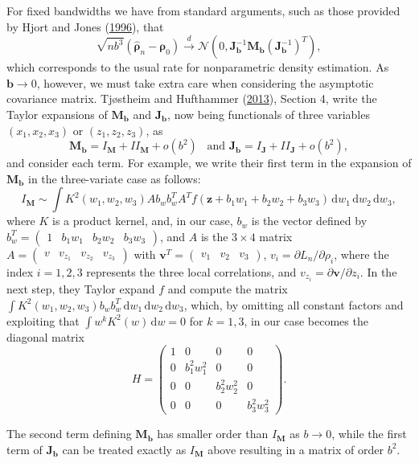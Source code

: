 \documentclass[
  12pt,
  letterpaper]{article}
\numberwithin{equation}{section}
\newcommand{\z}{\bm{z}}
\newcommand{\fv}{\bm{v}}
\newcommand{\frho}{\bm{\rho}}
\newcommand{\hfrho}{\widehat{\bm{\rho}}}
\newcommand{\hh}{\bm{b}}
\newcommand{\Jb}{\bm{J}_{\hh}}
\newcommand{\Mb}{\bm{M}_{\hh}}
\begin{document}
For fixed bandwidths we have from standard arguments, such as those provided by Hjort and Jones (\protect\hyperlink{ref-hjort1996locally}{1996}), that
\begin{equation}
\sqrt{nb^3}\left(\hfrho_n - \frho_0\right) \stackrel{d}{\rightarrow} \mathcal{N}(0, \Jb^{-1}\Mb(\Jb^{-1})^T),
\label{eq:fixed-h}
\end{equation}
which corresponds to the usual rate for nonparametric density estimation. As \(\hh\rightarrow0\), however, we must take extra care when considering the asymptotic covariance matrix. Tjøstheim and Hufthammer (\protect\hyperlink{ref-tjostheim2013local}{2013}), Section 4, write the Taylor expansions of \(\Mb\) and \(\Jb\), now being functionals of three variables \((x_1, x_2, x_3)\) or \((z_1,z_2,z_3)\), as
\[\Mb = I_{\bm{M}} + II_{\bm{M}} + o(b^2) \,\,\, \textrm{ and } \Jb = I_{\bm{J}} + II_{\bm{J}} + o(b^2),\]
and consider each term. For example, we write their first term in the expansion of \(\Mb\) in the three-variate case as follows:
\[I_{\bm{M}} \sim \int K^2(w_1, w_2, w_3)Ab_wb_w^TA^Tf(\z + b_1w_1 + b_2w_2 + b_3w_3)\,\textrm{d}w_1\,\textrm{d}w_2\,\textrm{d}w_3,\]
where \(K\) is a product kernel, and, in our case, \(b_w\) is the vector defined by \(b_w^T = \begin{pmatrix} 1 & b_1w_1 & b_2w_2 & b_3w_3 \end{pmatrix}\), and \(A\) is the \(3\times 4\) matrix \(A = \begin{pmatrix} v & v_{z_1} & v_{z_2} & v_{z_3}\end{pmatrix}\) with \(\fv^T = \begin{pmatrix} v_1 & v_2 & v_3 \end{pmatrix}\), \(v_i = \partial L_n/\partial \rho_i\), where the index \(i=1,2,3\) represents the three local correlations, and \(v_{z_i} = \partial \fv/\partial z_i\). In the next step, they Taylor expand \(f\) and compute the matrix \(\int K^2(w_1, w_2, w_3)b_wb_w^T\,\textrm{d}w_1\,\textrm{d}w_2\,\textrm{d}w_3\), which, by omitting all constant factors and exploiting that \(\int w^k K^2(w)\,\textrm{d}w = 0\) for \(k = 1,3\), in our case becomes the diagonal matrix
\[H = \begin{pmatrix} 1 & 0 & 0 & 0 \\ 0 & b_1^2w_1^2 & 0 & 0 \\ 0 & 0 & b_2^2w_2^2 & 0 \\ 0 & 0 & 0 & b_3^2w_3^2 \end{pmatrix}.\]

The second term defining \(\Mb\) has smaller order than \(I_{\bm{M}}\) as \(b \rightarrow 0\), while the first term of \(\Jb\) can be treated exactly as \(I_{\bm{M}}\) above resulting in a matrix of order \(b^2\).
\end{document}
